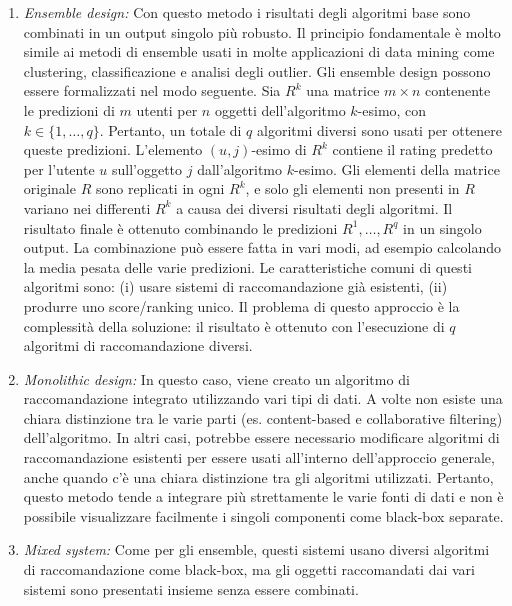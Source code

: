 \documentclass[12pt,italian]{report}
\begin{document}
\begin{enumerate}
 \item \textit{Ensemble design:} Con questo metodo i risultati degli algoritmi base sono combinati in un output singolo più robusto. Il principio fondamentale è molto simile ai metodi di ensemble usati in molte applicazioni di data mining come clustering, classificazione e analisi degli outlier. 
Gli ensemble design possono essere formalizzati nel modo seguente. Sia $R^k$ una matrice $m \times n$ contenente le predizioni di $m$ utenti per $n$ oggetti dell'algoritmo $k$-esimo, con $k \in \{1, \dots ,q\}$. Pertanto, un totale di $q$ algoritmi diversi sono usati per ottenere queste predizioni. L'elemento $(u,j)$-esimo di $R^k$ contiene il rating predetto per l'utente $u$ sull'oggetto $j$ dall'algoritmo $k$-esimo. Gli elementi della matrice originale $R$ sono replicati in ogni $R^k$, e solo gli elementi non presenti in $R$ variano nei differenti $R^k$ a causa dei diversi risultati degli algoritmi. Il risultato finale è ottenuto combinando le predizioni $R^1, \dots, R^q$ in un singolo output. La combinazione può essere fatta in vari modi, ad esempio calcolando la media pesata delle varie predizioni. Le caratteristiche comuni di questi algoritmi sono: (i) usare sistemi di raccomandazione già esistenti, (ii) produrre uno score/ranking unico. Il problema di questo approccio è la complessità della soluzione: il risultato è ottenuto con l'esecuzione di $q$ algoritmi di raccomandazione diversi.

 \item \textit{Monolithic design:} In questo caso, viene creato un algoritmo di raccomandazione integrato utilizzando vari tipi di dati. A volte non esiste una chiara distinzione tra le varie parti (es. content-based e collaborative filtering) dell'algoritmo. In altri casi, potrebbe essere necessario modificare algoritmi di raccomandazione esistenti per essere usati all'interno dell'approccio generale, anche quando c'è una chiara distinzione tra gli algoritmi utilizzati.  Pertanto, questo metodo tende a integrare più strettamente le varie fonti di dati e non è possibile visualizzare facilmente i singoli componenti come black-box separate.
 
 \item \textit{Mixed system:}  Come per gli ensemble, questi sistemi usano diversi algoritmi di raccomandazione come black-box, ma gli oggetti raccomandati dai vari sistemi sono presentati insieme senza essere combinati.
\end{enumerate} 
\end{document}
